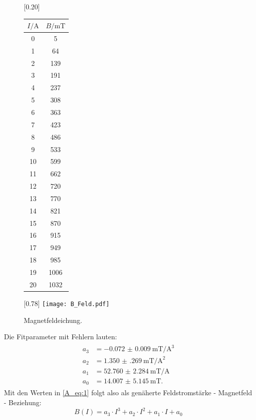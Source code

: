 \begin{figure}[h!]
  \centering
  [0.20\textwidth]{
  \centering
  \begin{tabular}{c c}
    \toprule
    $I / \si{\ampere}$ & $B / \si{\milli\tesla}$ \\
    \midrule
    0 & 5 \\
    1 & 64 \\
    2 & 139 \\
    3 & 191 \\
    4 & 237 \\
    5 & 308 \\
    6 & 363 \\
    7 & 423 \\
    8 & 486 \\
    9 & 533 \\
    10 & 599 \\
    11 & 662 \\
    12 & 720 \\
    13 & 770 \\
    14 & 821 \\
    15 & 870 \\
    16 & 915 \\
    17 & 949 \\
    18 & 985 \\
    19 & 1006 \\
    20 & 1032 \\
    \bottomrule
  \end{tabular}
  }
  [0.78\textwidth]{
  \centering
  \texttt{[image: B\_Feld.pdf]}
  }
  \caption{Magnetfeldeichung.}
  \label{A_Abb:1}
\end{figure}

Die Fitparameter mit Fehlern lauten:
\begin{align}
\begin{split}
  a_3 &= \SI{-0.072(9)}{\milli\tesla\per\cubic\ampere}\\
  a_2 &= \SI{1.350(269)}{\milli\tesla\per\square\ampere}\\
  a_1 &= \SI{52.760(2284)}{\milli\tesla\per\ampere}\\
  a_0 &= \SI{14.007(5145)}{\milli\tesla}.
  \label{A_eq:1}
\end{split}
\end{align}
Mit den Werten in \eqref{A_eq:1} folgt also als genäherte Feldstromstärke - Magnetfeld
- Beziehung:
\begin{equation}
  B(I) = a_3 \cdot I^3 + a_2 \cdot I^2 + a_1 \cdot I + a_0
\end{equation}



\newpage
\nocite{*}
\printbibliography
